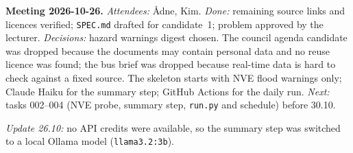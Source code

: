 \documentclass{article}
\newcommand{\code}[1]{\texttt{#1}}
\begin{document}
\textbf{Meeting 2026-10-26.} \emph{Attendees:} Ådne, Kim. \emph{Done:} remaining source links and licences verified; \code{SPEC.md} drafted for candidate~1; problem approved by the lecturer. \emph{Decisions:} hazard warnings digest chosen. The council agenda candidate was dropped because the documents may contain personal data and no reuse licence was found; the bus brief was dropped because real-time data is hard to check against a fixed source. The skeleton starts with NVE flood warnings only; Claude Haiku for the summary step; GitHub Actions for the daily run. \emph{Next:} tasks 002--004 (NVE probe, summary step, \code{run.py} and schedule) before 30.10.

\emph{Update 26.10:} no API credits were available, so the summary step was switched to a local Ollama model (\code{llama3.2:3b}).
\end{document}
